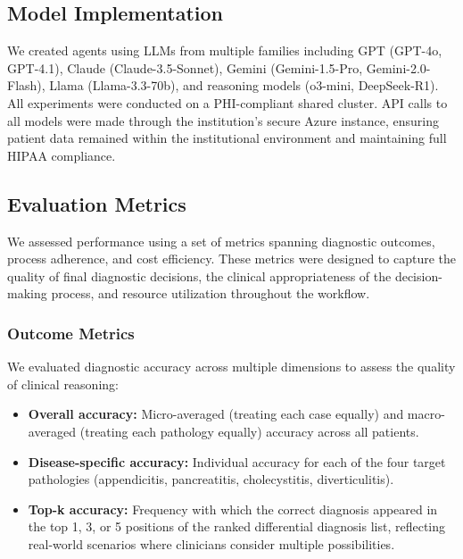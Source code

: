 \documentclass[manuscript, nonacm]{acmart}
\begin{document}
\subsection{Model Implementation}

We created agents using LLMs from multiple families including GPT (GPT-4o, GPT-4.1), Claude (Claude-3.5-Sonnet), Gemini (Gemini-1.5-Pro, Gemini-2.0-Flash), Llama (Llama-3.3-70b), and reasoning models (o3-mini, DeepSeek-R1). All experiments were conducted on a PHI-compliant shared cluster. API calls to all models were made through the institution's secure Azure instance, ensuring patient data remained within the institutional environment and maintaining full HIPAA compliance.

\subsection{Evaluation Metrics}
\label{sec:eval_metrics}
We assessed performance using a set of metrics spanning diagnostic outcomes, process adherence, and cost efficiency. These metrics were designed to capture the quality of final diagnostic decisions, the clinical appropriateness of the decision-making process, and resource utilization throughout the workflow.

\subsubsection{\textbf{Outcome Metrics}}
We evaluated diagnostic accuracy across multiple dimensions to assess the quality of clinical reasoning:

\begin{itemize}
    \item \textbf{Overall accuracy:} Micro-averaged (treating each case equally) and macro-averaged (treating each pathology equally) accuracy across all patients.
    
    \item \textbf{Disease-specific accuracy:} Individual accuracy for each of the four target pathologies (appendicitis, pancreatitis, cholecystitis, diverticulitis).
    
    \item \textbf{Top-k accuracy:} Frequency with which the correct diagnosis appeared in the top 1, 3, or 5 positions of the ranked differential diagnosis list, reflecting real-world scenarios where clinicians consider multiple possibilities.
\end{itemize}
\end{document}
